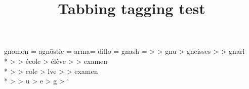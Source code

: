 \documentclass{article}
\title{Tabbing tagging test}
\begin{document}
\begin{Tabbing}
gnomon \TAB= agn\=ostic \TAB= arma\TAB= dillo \TAB= gnash \TAB= \kill
\TAB> \TAB> gnu \TAB> gneisses \TAB> \TAB> gnarl
\\*
\TAB> \TAB> \'ecole \TAB> \'el\`eve \TAB> \TAB> examen
\\*
\TAB> \TAB> cole \TAB> lve \TAB> \TAB> examen
\\*
\TAB> \TAB> u \TAB> e \TAB> g \TAB>
\TAB`
\end{Tabbing}
\end{document}
